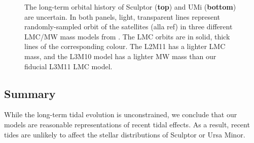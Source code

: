\begin{figure}
\centering
{}
\caption[Sculptor Orbits with LMC]{The long-term orbital history of
Sculptor (\textbf{top}) and UMi (\textbf{bottom}) are uncertain. In both
panels, light, transparent lines represent randomly-sampled orbit of the
satellites (alla ref) in three different LMC/MW mass models from
\citet{vasiliev2024}. The LMC orbits are in solid, thick lines of the
corresponding colour. The L2M11 has a lighter LMC mass, and the L3M10
model has a lighter MW mass than our fiducial L3M11 LMC
model.}\label{fig:scl_orbit_lmc_uncert}
\end{figure}

\subsection{Summary}\label{summary-2}

While the long-term tidal evolution is unconstrained, we conclude that
our models are reasonable representations of recent tidal effects. As a
result, recent tides are unlikely to affect the stellar distributions of
Sculptor or Ursa Minor.
